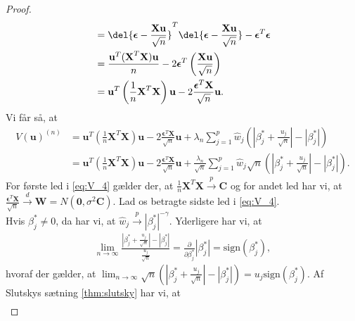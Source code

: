 \begin{proof}
\begin{align*}
&= \del{\boldsymbol{\epsilon} - \frac{\textbf{X}\textbf{u}}{\sqrt{n}}}^T \del{\boldsymbol{\epsilon} - \frac{\textbf{X}\textbf{u}}{\sqrt{n}}} - \boldsymbol{\epsilon}^T \boldsymbol{\epsilon} \\
& = \frac{\textbf{u}^T (\textbf{X}^T\textbf{X})  \textbf{u}}{n} - 2 \boldsymbol{\epsilon}^T \left( \frac{\mathbf{X}\mathbf{u}}{\sqrt{n}} \right) \\ 
&= \textbf{u}^T \left(\frac{1}{n}\textbf{X}^T\textbf{X}\right)  \textbf{u}- 2 \frac{\boldsymbol{\epsilon}^T \textbf{X}}{\sqrt{n}}\textbf{u}.
\end{align*}
Vi får så, at 
\begin{align}
V(\mathbf{u})^{(n)} & = \textbf{u}^T \left(\frac{1}{n}\textbf{X}^T\textbf{X}\right)  \textbf{u} - 2 \frac{\boldsymbol{\epsilon}^T \textbf{X}}{\sqrt{n}}\textbf{u} + \lambda_n \sum_{j=1}^p \widehat{w}_j \left( \left\vert \beta_j^{*} + \frac{u_j}{\sqrt{n}} \right\vert - \left\vert \beta_j^{*}\right\vert
\right) \nonumber \\
 & = \textbf{u}^T \left(\frac{1}{n}\textbf{X}^T\textbf{X}\right)  \textbf{u} - 2 \frac{\boldsymbol{\epsilon}^T \textbf{X}}{\sqrt{n}}\textbf{u} +\frac{\lambda_n}{\sqrt{n}} \sum_{j=1}^p \widehat{w}_j \sqrt{n} \left( \left\vert \beta_j^{*} + \frac{u_j}{\sqrt{n}} \right\vert - \left\vert \beta_j^{*} \right\vert
\right). \label{eq:V_4}
\end{align}
%
For første led i \eqref{eq:V_4} gælder der, at $\frac{1}{n} \mathbf{X}^T \mathbf{X} \overset{p}{\rightarrow} \mathbf{C}$ og for andet led har vi, at $\frac{\boldsymbol{\epsilon}^T \mathbf{X}}{\sqrt{n}} \overset{d}{\rightarrow} \textbf{W}=N(\textbf{0},\sigma^2 \boldsymbol{C})$. 
Lad os betragte sidste led i \eqref{eq:V_4}. \\
Hvis $\beta_j^{*} \neq 0$, da har vi, at $\widehat{w}_j \overset{p}{\rightarrow} \left\vert \beta_j^{*} \right\vert^{-\gamma}$. Yderligere har vi, at 
\begin{align*}
\lim_{n\rightarrow \infty}
\frac{\left\vert \beta_j^{*} +\frac{u_j}{\sqrt{n}} \right\vert - \left\vert \beta_j^{*} \right\vert}{\frac{u_j}{\sqrt{n}}} =\frac{\partial}{\partial \beta_j^{*}} \left\vert \beta_j^{*} \right\vert =\text{sign}\left(\beta_j^{*} \right),
\end{align*} 
hvoraf der gælder, at $\lim_{n\rightarrow \infty} \sqrt{n} \left( \left\vert \beta_j^{*} +\frac{u_j}{\sqrt{n}} \right\vert - \left\vert \beta_j^{*} \right\vert \right) = u_j \text{sign}\left(\beta_j^{*} \right)$.
Af Slutskys sætning \ref{thm:slutsky} har vi, at 
\begin{align*}

\end{align*}
\end{proof}
